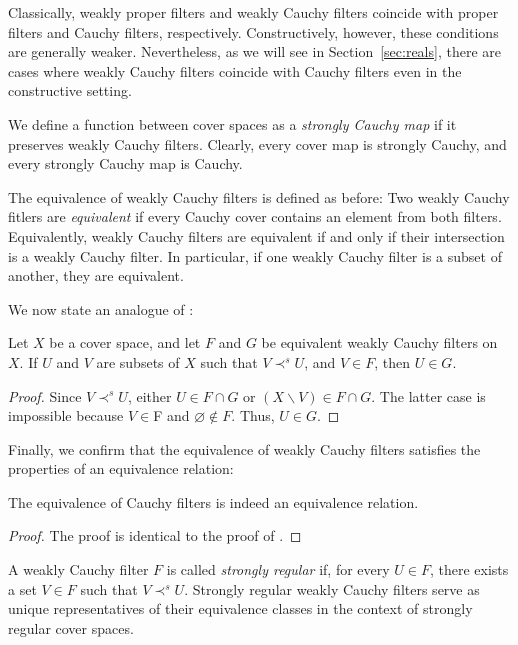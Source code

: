 \documentclass[reqno]{amsart}
\theoremstyle{definition}
\theoremstyle{remark}
\numberwithin{figure}{section}
\newcommand{\rb}{\prec}
\begin{document}
\begin{remark}
Classically, weakly proper filters and weakly Cauchy filters coincide with proper filters and Cauchy filters, respectively.
Constructively, however, these conditions are generally weaker.
Nevertheless, as we will see in Section~\ref{sec:reals}, there are cases where weakly Cauchy filters coincide with Cauchy filters even in the constructive setting.
\end{remark}

We define a function between cover spaces as a \emph{strongly Cauchy map} if it preserves weakly Cauchy filters.
Clearly, every cover map is strongly Cauchy, and every strongly Cauchy map is Cauchy.

The equivalence of weakly Cauchy filters is defined as before:
Two weakly Cauchy fitlers are \emph{equivalent} if every Cauchy cover contains an element from both filters.
Equivalently, weakly Cauchy filters are equivalent if and only if their intersection is a weakly Cauchy filter.
In particular, if one weakly Cauchy filter is a subset of another, they are equivalent.

We now state an analogue of :

\begin{lem}
Let $X$ be a cover space, and let $F$ and $G$ be equivalent weakly Cauchy filters on $X$.
If $U$ and $V$ are subsets of $X$ such that $V \rb^s U$, and $V \in F$, then $U \in G$.
\end{lem}
\begin{proof}
Since $V \rb^s U$, either $U \in F \cap G$ or $(X \backslash V) \in F \cap G$.
The latter case is impossible because $V \in $F and $\varnothing \notin F$.
Thus, $U \in G$.
\end{proof}

Finally, we confirm that the equivalence of weakly Cauchy filters satisfies the properties of an equivalence relation:

\begin{prop}
The equivalence of Cauchy filters is indeed an equivalence relation.
\end{prop}
\begin{proof}
The proof is identical to the proof of .
\end{proof}

A weakly Cauchy filter $F$ is called \emph{strongly regular} if, for every $U \in F$, there exists a set $V \in F$ such that $V \rb^s U$.
Strongly regular weakly Cauchy filters serve as unique representatives of their equivalence classes in the context of strongly regular cover spaces.
\end{document}
